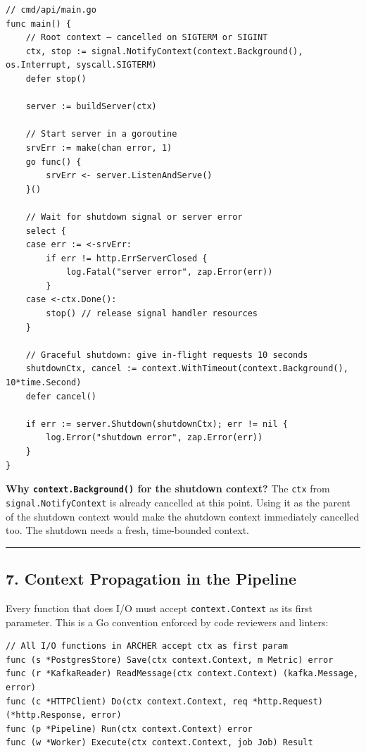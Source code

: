 \documentclass[11pt,a4paper,oneside]{book}
\begin{document}
\begin{verbatim}
// cmd/api/main.go
func main() {
    // Root context — cancelled on SIGTERM or SIGINT
    ctx, stop := signal.NotifyContext(context.Background(), os.Interrupt, syscall.SIGTERM)
    defer stop()

    server := buildServer(ctx)

    // Start server in a goroutine
    srvErr := make(chan error, 1)
    go func() {
        srvErr <- server.ListenAndServe()
    }()

    // Wait for shutdown signal or server error
    select {
    case err := <-srvErr:
        if err != http.ErrServerClosed {
            log.Fatal("server error", zap.Error(err))
        }
    case <-ctx.Done():
        stop() // release signal handler resources
    }

    // Graceful shutdown: give in-flight requests 10 seconds
    shutdownCtx, cancel := context.WithTimeout(context.Background(), 10*time.Second)
    defer cancel()

    if err := server.Shutdown(shutdownCtx); err != nil {
        log.Error("shutdown error", zap.Error(err))
    }
}
\end{verbatim}

\textbf{Why \texttt{context.Background()} for the shutdown context?} The
\texttt{ctx} from \texttt{signal.NotifyContext} is already cancelled at
this point. Using it as the parent of the shutdown context would make
the shutdown context immediately cancelled too. The shutdown needs a
fresh, time-bounded context.

\begin{center}\rule{0.5\linewidth}{0.5pt}\end{center}

\subsection{7. Context Propagation in the
Pipeline}

Every function that does I/O must accept \texttt{context.Context} as its
first parameter. This is a Go convention enforced by code reviewers and
linters:

\begin{verbatim}
// All I/O functions in ARCHER accept ctx as first param
func (s *PostgresStore) Save(ctx context.Context, m Metric) error
func (r *KafkaReader) ReadMessage(ctx context.Context) (kafka.Message, error)
func (c *HTTPClient) Do(ctx context.Context, req *http.Request) (*http.Response, error)
func (p *Pipeline) Run(ctx context.Context) error
func (w *Worker) Execute(ctx context.Context, job Job) Result
\end{verbatim}
\end{document}
